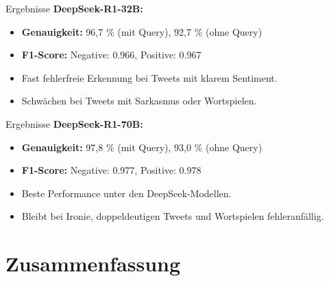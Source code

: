 \documentclass[aspectratio=169]{beamer} %
\begin{document}
\begin{frame}{Ergebnisse}
  \Large
  \textbf{DeepSeek-R1-32B:}

  \vspace{0.5cm}
  \begin{itemize}
      \item \textbf{Genauigkeit:} 96,7 \% (mit Query), 92,7 \% (ohne Query)
      \item \textbf{F1-Score:} Negative: 0.966, Positive: 0.967
      \item Fast fehlerfreie Erkennung bei Tweets mit klarem Sentiment.
      \item Schwächen bei Tweets mit Sarkasmus oder Wortspielen.
  \end{itemize}
\end{frame}

\begin{frame}{Ergebnisse}
  \Large
  \textbf{DeepSeek-R1-70B:}

  \vspace{0.5cm}
  \begin{itemize}
      \item \textbf{Genauigkeit:} 97,8 \% (mit Query), 93,0 \% (ohne Query)
      \item \textbf{F1-Score:} Negative: 0.977, Positive: 0.978
      \item Beste Performance unter den DeepSeek-Modellen.
      \item Bleibt bei Ironie, doppeldeutigen Tweets und Wortspielen fehleranfällig.
  \end{itemize}
\end{frame}








\section{Zusammenfassung}
\end{document}
